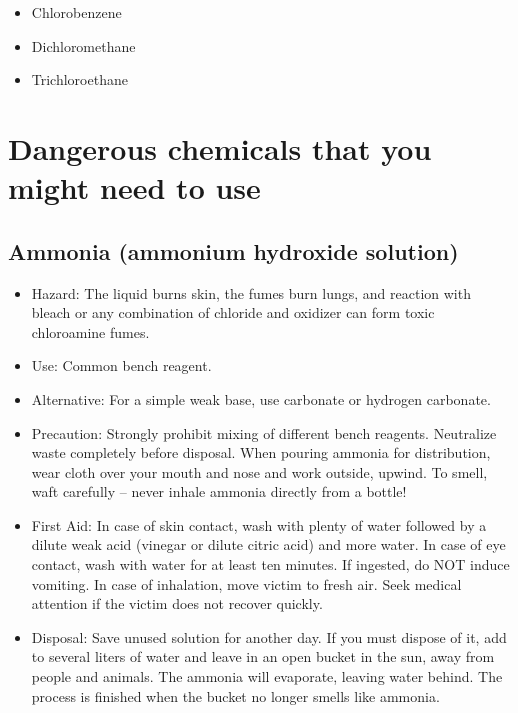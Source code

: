 \begin{itemize}

\item{Chlorobenzene}

\item{Dichloromethane}

\item{Trichloroethane}

\end{itemize}

\section{Dangerous chemicals that you might need to use}
\label{cha:dangerchem}

\subsection{Ammonia (ammonium hydroxide solution)}

\begin{itemize}

\item{Hazard: The liquid burns skin, the fumes burn lungs, 
and reaction with bleach or any combination of chloride and oxidizer 
can form toxic chloroamine fumes.}

\item{Use: Common bench reagent.}

\item{Alternative: For a simple weak base, 
use carbonate or hydrogen carbonate.}

\item{Precaution: Strongly prohibit mixing of different bench reagents. 
Neutralize waste completely before disposal. 
When pouring ammonia for distribution, 
wear cloth over your mouth and nose and work outside, upwind. 
To smell, waft carefully – never inhale ammonia directly from a bottle!}

\item{First Aid: In case of skin contact, 
wash with plenty of water followed by a dilute weak acid 
(vinegar or dilute citric acid) and more water. 
In case of eye contact, wash with water for at least ten minutes. 
If ingested, do NOT induce vomiting. 
In case of inhalation, move victim to fresh air. 
Seek medical attention if the victim does not recover quickly.}

\item{Disposal: Save unused solution for another day. 
If you must dispose of it, add to several liters of water 
and leave in an open bucket in the sun, 
away from people and animals. 
The ammonia will evaporate, leaving water behind. 
The process is finished when the bucket no longer smells like ammonia.}

\end{itemize}


